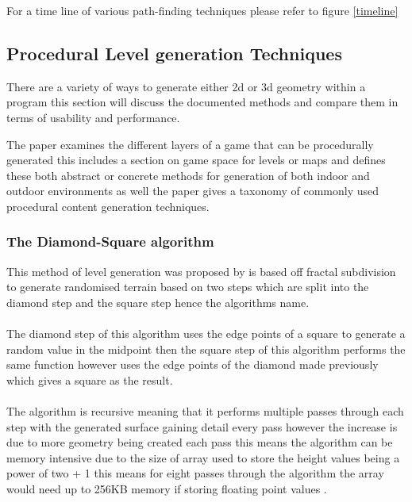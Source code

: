For a time line of various path-finding techniques please refer to figure \ref{timeline}


\subsection{Procedural Level generation Techniques}
There are a variety of ways to generate either 2d or 3d geometry within a program this section will discuss the documented methods and compare them in terms of usability and performance.

The paper \cite{LG-Survey} examines the different layers of a game that can be procedurally generated this includes a section on game space for levels or maps and defines these both abstract or concrete methods for generation of both indoor and outdoor environments as well the paper gives a taxonomy of commonly used procedural content generation techniques.  

\subsubsection{The Diamond-Square algorithm}
This method of level generation was proposed by \cite{DSA2} is based off fractal subdivision to generate randomised terrain based on two steps which are split into the diamond step  and the square step hence the algorithms name.\\\\ The diamond step of this algorithm uses the edge points of a square to generate a random value in the midpoint then the square step of this algorithm performs the same function however uses the edge points of the diamond made previously which gives a square as the result. \\\\The algorithm is recursive meaning that it performs multiple passes through each step with the generated surface gaining detail every pass however the increase is due to more geometry being created each pass this means the algorithm can be memory intensive due to the size of array used to store the height values being a power of two + 1 this means for eight passes through the algorithm the array would need up to 256KB memory if storing floating point values \cite{LevelDSA}.

